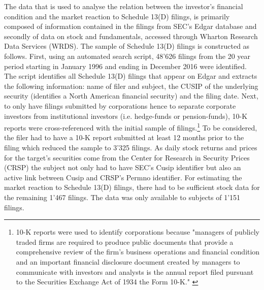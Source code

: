 \documentclass[12pt]{article}
\begin{document}
The data that is used to analyse the relation between the investor's financial condition and the market reaction to Schedule 13(D) filings,  is primarily composed of information contained in the filings from SEC's Edgar database and secondly of data on stock and fundamentals,  accessed through Wharton Research Data Services (WRDS). The sample of Schedule 13(D) filings is constructed as follows. First, using an automated search script, 48'626 filings from the 20 year period starting in January 1996 and ending in December 2016 were identified.  The script identifies all Schedule 13(D) filings that appear on Edgar and extracts the following information: name of filer and subject, the CUSIP of the underlying security (identifies a North American financial security) and the filing date. Next, to only have filings submitted by corporations hence to separate corporate investors from institutional investors (i.e. hedge-funds or pension-funds), 10-K reports were cross-referenced with the initial sample of filings.\footnote{10-K reports were used to identify corporations because "managers of publicly traded firms are required to produce public documents that provide a comprehensive review of the firm’s business operations and financial condition and an important financial disclosure document created by managers to communicate with investors and analysts is the annual report filed pursuant to the Securities Exchange Act of 1934 the Form 10-K." \citep[p. 1643]{Loughran2014}} To be considered, the filer had to have a 10-K report submitted at least 12 months prior to the filing which reduced the sample to 3'325 filings. As daily stock returns and prices for the target's securities come from the Center for Research in Security Prices (CRSP) the subject not only had to have SEC's Cusip identifier but also an active link between Cusip and CRSP's Permno identifier. For estimating the market reaction to Schedule 13(D) filings, there had to be sufficient stock data for the remaining 1'467 filings. The data was only available to subjects of 1'151 filings. 
\end{document}
